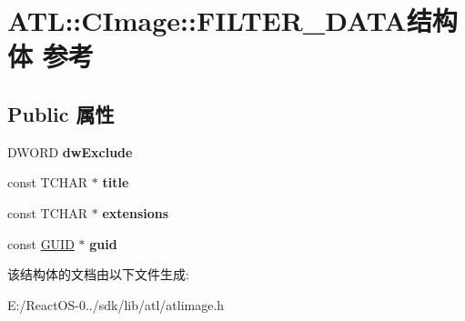 \hypertarget{struct_a_t_l_1_1_c_image_1_1_f_i_l_t_e_r___d_a_t_a}{}\section{A\+TL\+:\+:C\+Image\+:\+:F\+I\+L\+T\+E\+R\+\_\+\+D\+A\+T\+A结构体 参考}
\label{struct_a_t_l_1_1_c_image_1_1_f_i_l_t_e_r___d_a_t_a}
\subsection*{Public 属性}
\begin{DoxyCompactItemize}
\item 
\mbox{\label{struct_a_t_l_1_1_c_image_1_1_f_i_l_t_e_r___d_a_t_a_a593ac1385820765ecd941029b3830ab5}} 
D\+W\+O\+RD {\bfseries dw\+Exclude}
\item 
\mbox{\label{struct_a_t_l_1_1_c_image_1_1_f_i_l_t_e_r___d_a_t_a_a31ed2326b2d6f08c17d1117920439e6e}} 
const T\+C\+H\+AR $\ast$ {\bfseries title}
\item 
\mbox{\label{struct_a_t_l_1_1_c_image_1_1_f_i_l_t_e_r___d_a_t_a_a9a3d7c332887a809b45ed10c69edafdf}} 
const T\+C\+H\+AR $\ast$ {\bfseries extensions}
\item 
\mbox{\label{struct_a_t_l_1_1_c_image_1_1_f_i_l_t_e_r___d_a_t_a_a8d4972ff71f8fc91cea38046f55d6748}} 
const \hyperlink{interface_g_u_i_d}{G\+U\+ID} $\ast$ {\bfseries guid}
\end{DoxyCompactItemize}


该结构体的文档由以下文件生成\+:\begin{DoxyCompactItemize}
\item 
E\+:/\+React\+O\+S-\/0../sdk/lib/atl/atlimage.\+h\end{DoxyCompactItemize}
